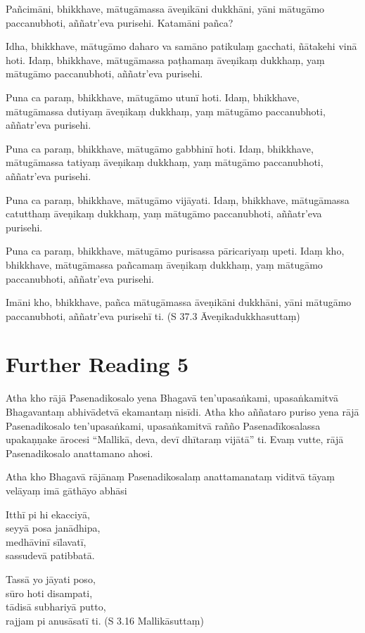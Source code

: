 Pañcimāni, bhikkhave, mātugāmassa āveṇikāni dukkhāni, yāni mātugāmo paccanubhoti, aññatr’eva purisehi. Katamāni pañca?

Idha, bhikkhave, mātugāmo daharo va samāno patikulaṃ gacchati, ñātakehi vinā hoti. Idaṃ, bhikkhave, mātugāmassa paṭhamaṃ āveṇikaṃ dukkhaṃ, yaṃ mātugāmo paccanubhoti, aññatr’eva purisehi.

Puna ca paraṃ, bhikkhave, mātugāmo utunī hoti. Idaṃ, bhikkhave, mātugāmassa dutiyaṃ āveṇikaṃ dukkhaṃ, yaṃ mātugāmo paccanubhoti, aññatr’eva purisehi.

Puna ca paraṃ, bhikkhave, mātugāmo gabbhinī hoti. Idaṃ, bhikkhave, mātugāmassa tatiyaṃ āveṇikaṃ dukkhaṃ, yaṃ mātugāmo paccanubhoti, aññatr’eva purisehi.

Puna ca paraṃ, bhikkhave, mātugāmo vijāyati. Idaṃ, bhikkhave, mātugāmassa catutthaṃ āveṇikaṃ dukkhaṃ, yaṃ mātugāmo paccanubhoti, aññatr’eva purisehi.

Puna ca paraṃ, bhikkhave, mātugāmo purisassa pāricariyaṃ upeti. Idaṃ kho, bhikkhave, mātugāmassa pañcamaṃ āveṇikaṃ dukkhaṃ, yaṃ mātugāmo paccanubhoti, aññatr’eva purisehi.

Imāni kho, bhikkhave, pañca mātugāmassa āveṇikāni dukkhāni, yāni mātugāmo paccanubhoti, aññatr’eva purisehī ti. \hfill(S 37.3 Āveṇikadukkhasuttaṃ)

\section*{Further Reading 5}

Atha kho rājā Pasenadikosalo yena Bhagavā ten’upasaṅkami, upasaṅkamitvā Bhagavantaṃ abhivādetvā ekamantaṃ nisīdi. Atha kho aññataro puriso yena rājā Pasenadikosalo ten’upasaṅkami, upasaṅkamitvā rañño Pasenadīkosalassa upakaṇṇake ārocesi “Mallikā, deva, devī dhītaraṃ vijātā” ti. Evaṃ vutte, rājā Pasenadikosalo anattamano ahosi.

Atha kho Bhagavā rājānaṃ Pasenadikosalaṃ anattamanataṃ viditvā tāyaṃ velāyaṃ imā gāthāyo abhāsi

Itthī pi hi ekacciyā,\\
seyyā posa janādhipa,\\
medhāvinī sīlavatī,\\
sassudevā patibbatā.

Tassā yo jāyati poso,\\
sūro hoti disampati,\\
tādisā subhariyā putto,\\
rajjam pi anusāsatī ti. \hfill(S 3.16 Mallikāsuttaṃ)